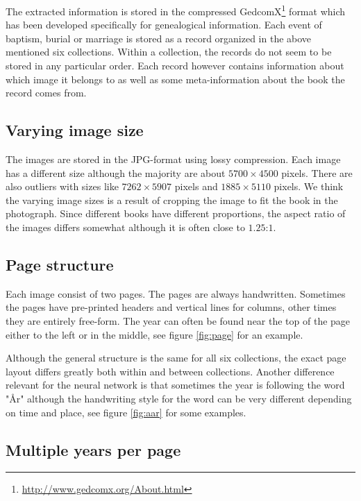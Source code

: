 The extracted information is stored in the compressed GedcomX\footnote{\url{http://www.gedcomx.org/About.html}} format which has been developed specifically for genealogical information.
Each event of baptism, burial or marriage is stored as a record organized in the above mentioned six collections. Within a collection, the records do not seem to be stored in any particular order. Each record however contains information about which image it belongs to as well as some meta-information about the book the record comes from.

\subsection{Varying image size}

The images are stored in the JPG-format using lossy compression. Each image has a different size although the majority are about $5700 \times 4500$ pixels. There are also outliers with sizes like $7262 \times 5907$ pixels and $1885 \times 5110$ pixels. We think the varying image sizes is a result of cropping the image to fit the book in the photograph.
Since different books have different proportions, the aspect ratio of the images differs somewhat although it is often close to $1.25$:$1$.

\subsection{Page structure}

Each image consist of two pages. The pages are always handwritten. Sometimes the pages have pre-printed headers and vertical lines for columns, other times they are entirely free-form.
The year can often be found near the top of the page either to the left or in the middle, see figure \ref{fig:page} for an example.



Although the general structure is the same for all six collections, the exact page layout differs greatly both within and between collections. Another difference relevant for the neural network is that sometimes the year is following the word "\r{A}r" although the handwriting style for the word can be very different depending on time and place, see figure \ref{fig:aar} for some examples.


\subsection{Multiple years per page} \label{sssec:swe_multiyear}

